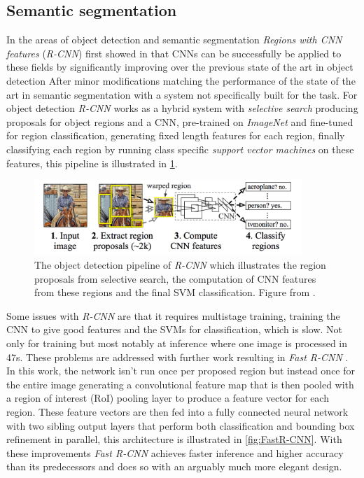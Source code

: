 \documentclass{kththesis}
\newcommand{\bibentry}[1]{\parencite{#1}}
\begin{document}
\subsection{Semantic segmentation}
In the areas of object detection and semantic segmentation \emph{Regions
  with CNN features} (\emph{R-CNN}) \bibentry{girshick2014rich} 
first showed in that CNNs can be successfully be applied to these fields by
significantly improving over the previous state of the art in object detection
\bibentry{ren2013histograms} After minor modifications matching the
performance of the state of the art in semantic segmentation
\bibentry{carreira2012semantic} with a system not specifically built for the
task. For object detection \emph{R-CNN} works as a hybrid system with
\emph{selective search} \bibentry{uijlings2013selective} producing proposals for
object regions and a CNN, pre-trained on \emph{ImageNet}
\bibentry{deng2009imagenet} and fine-tuned for region classification, generating
fixed length features for each region, finally classifying each region by
running class specific \emph{support vector machines}
\bibentry{boser1992training} on these features, this pipeline is illustrated in \cref{fig:R-CNN}.

\begin{figure}[h]
  \centering
  \includegraphics[width=0.9\textwidth]{R-CNN}
  \caption{The object detection pipeline of \textit{R-CNN} which illustrates the
  region proposals from selective search, the computation of CNN features from
  these regions and the final SVM classification. Figure from \textcite{girshick2014rich}.}
  \label{fig:R-CNN}
  \end{figure}

Some issues with \emph{R-CNN}
are that it requires multistage training, training the CNN to give good
features and the SVMs for classification, which is slow. Not only for training
but most notably at inference where one image is processed in 47s.
These problems are addressed with further work resulting in \emph{Fast R-CNN}
\bibentry{girshick2015fast}. In this work, the network isn't run once per proposed region but
instead once for the entire image generating a convolutional feature map that
is then pooled with a region of interest (RoI) pooling layer to produce a
feature vector for each region. These feature vectors are then fed into a fully
connected neural network with two sibling output layers that perform both
classification and bounding box refinement in parallel, this architecture is
illustrated in \cref{fig:FastR-CNN}. With these improvements
\emph{Fast R-CNN} achieves faster inference and higher accuracy than its
predecessors and does so with an arguably much more elegant design.
\end{document}
